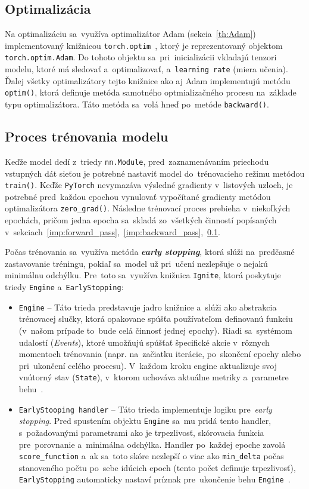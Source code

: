 \subsection{Optimalizácia}\label{imp:optimalisation}
Na optimalizáciu sa~využíva optimalizátor Adam (sekcia~\ref{th:Adam}) implementovaný knižnicou \texttt{torch.optim}~\cite{pytorch.optim}, ktorý je reprezentovaný objektom \texttt{torch.optim.Adam}. Do tohoto objektu sa~pri~inicializácii vkladajú tenzori modelu, ktoré má sledovať a~optimalizovať, a~\texttt{learning rate} (miera učenia). Ďalej všetky optimalizátory tejto knižnice ako aj Adam implementujú metódu \texttt{optim()}, ktorá definuje metóda samotného optmializačného procesu na~základe typu optimalizátora. Táto metóda sa~volá hneď po~metóde \texttt{backward()}.

\subsection{Proces trénovania modelu}
Keďže model dedí z~triedy \texttt{nn.Module}, pred~zaznamenávaním priechodu vstupných dát sieťou je potrebné nastaviť model do~trénovacieho režimu metódou \texttt{train()}. Keďže \texttt{PyTorch} nevymazáva výsledné gradienty v~listových uzloch, je potrebné pred~každou epochou vynulovať vypočítané gradienty metódou optimalizátora \texttt{zero\_grad()}. Následne trénovací proces prebieha v~niekoľkých epochách, pričom jedna epocha sa~skladá zo~všetkých činností popísaných v~sekciach~\ref{imp:forward_pass},~\ref{imp:backward_pass},~\ref{imp:optimalisation}.

Počas trénovania sa~využíva metóda \textit{\textbf{early stopping}}\label{early_stopping}, ktorá slúži na~predčasné zastavovanie tréningu, pokiaľ sa~model už pri~učení nezlepšuje o nejakú minimálnu odchýlku. Pre~toto sa~využíva knižnica \texttt{Ignite}, ktorá poskytuje triedy \texttt{Engine} a~\texttt{EarlyStopping}:
\begin{itemize}
    \item \texttt{Engine} -- Táto trieda predstavuje jadro knižnice a~slúži ako abstrakcia trénovacej slučky, ktorá opakovane spúšťa používateľom definovanú funkciu (v~našom prípade to~bude celá činnosť jednej epochy). Riadi sa~systémom udalostí (\textit{Events}), ktoré umožňujú spúšťať špecifické akcie v~rôznych momentoch trénovania (napr. na~začiatku iterácie, po~skončení epochy alebo pri~ukončení celého procesu). V~každom kroku engine aktualizuje svoj vnútorný stav (\texttt{State}), v~ktorom uchováva aktuálne metriky a~parametre behu~\cite{pytorch.ignite_engine}.
    \item \texttt{EarlyStooping handler} -- Táto trieda implementuje logiku pre~\textit{early stopping}. Pred spustením objektu \texttt{Engine} sa~mu pridá tento handler, s~požadovanými parametrami ako je trpezlivosť, skórovacia funkcia pre~porovnanie a~minimálna odchýlka.
    Handler po~každej epoche zavolá \texttt{score\_function} a~ak sa~toto skóre nezlepší o viac ako \texttt{min\_delta} počas stanoveného počtu po~sebe idúcich epoch (tento počet definuje trpezlivosť), \texttt{EarlyStopping} automaticky nastaví príznak pre~ukončenie behu \texttt{Engine}~\cite{pytorch.ignite_handlers}.
\end{itemize}

